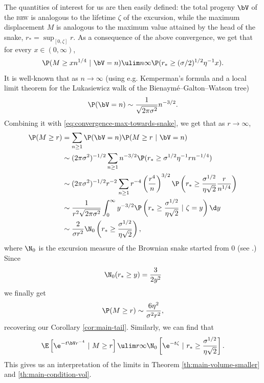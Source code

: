 \documentclass[10pt,a4paper]{article}
\newcommand{\todo}[1]{\textcolor{blue}{\textbf{TODO:} #1}}
\newcommand{\brw}{\textsc{brw}\xspace}
\begin{document}
The quantities of interest for us are then easily defined: the total progeny $\bV$ of the \brw is analogous to the lifetime $\zeta$ of the excursion, while the maximum displacement $M$ is analogous to the maximum value attained by the head of the snake, $r_* = \sup_{[0,\zeta]} r$. As a consequence of the above convergence, we get that for every $x\in(0,\infty)$, 
\begin{equation}\label{eq:convergence-max-towards-snake}
\P(M\geq x n^{1/4} \ | \ \bV = n) \ulim n \infty \P(r_*\geq (\sigma/2)^{1/2} \eta^{-1} x) .
\end{equation}
It is well-known that as $n\to\infty$ (using e.g. Kemperman's formula and a local limit theorem for the Lukasiewicz walk of the Bienaymé--Galton--Watson tree)
\[ \P(\bV = n) \sim \frac{1}{\sqrt{2\pi\sigma^2}} n^{-3/2} . \]
Combining it with \eqref{eq:convergence-max-towards-snake}, we get that as $r\to\infty$,
\begin{align*}
\P(M\geq r) &= \sum_{n\geq 1} \P(\bV = n) \P(M\geq r \ | \ \bV=n) \\
&\sim (2\pi\sigma^2)^{-1/2} \sum_{n\geq 1} n^{-3/2} \P(r_* \geq \sigma^{1/2} \eta^{-1} r n^{-1/4}) \\
&\sim (2\pi\sigma^2)^{-1/2} r^{-2} \sum_{n\geq 1} r^{-4} \left( \frac{r^4}{n} \right)^{3/2} \P\left(r_* \geq \frac{\sigma^{1/2}}{\eta \sqrt{2}} \frac{r}{n^{1/4}} \right) \\
&\sim \frac{1}{r^2 \sqrt{2\pi\sigma^2}} \int_0^\infty y^{-3/2} \P\left(r_* \geq \frac{\sigma^{1/2}}{\eta\sqrt{2}} \ | \ \zeta = y \right)  \d y \\
&\sim \frac{2}{\sigma r^2} \N_0\left( r_* \geq \frac{\sigma^{1/2}}{\eta\sqrt{2}} \right) ,
\end{align*}
where $\N_0$ is the excursion measure of the Brownian snake started from $0$ (see \cite[Section III.5, Section IV.I and Section IV.6]{gall1999spatial}.) Since 
\[ \N_0(r_* \geq y) = \frac{3}{2y^2} \]
we finally get 
\[ \P(M\geq r) \sim \frac{6\eta^2}{\sigma^2 r^2} , \]
recovering our Corollary \ref{cor:main-tail}. Similarly, we can find that
\begin{align*}
\E\left[ \e^{-t\bV r^{-4}} \ | \ M\geq r \right] \ulim r \infty \N_0\left[ \e^{-t\zeta} \ | \ r_*\geq \frac{\sigma^{1/2}}{\eta\sqrt{2}} \right] .
\end{align*}
This gives us an interpretation of the limits in Theorem \ref{th:main-volume-smaller} and \ref{th:main-condition-vol}. 
\end{document}
